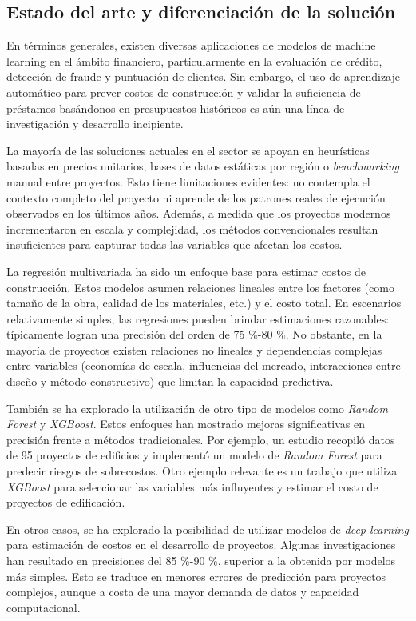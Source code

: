 \documentclass[
11pt, %
]{charter}
\begin{document}
\subsection*{Estado del arte y diferenciación de la solución}

En términos generales, existen diversas aplicaciones de modelos de machine learning en el ámbito financiero, particularmente en la evaluación de crédito, detección de fraude y puntuación de clientes. Sin embargo, el uso de aprendizaje automático para prever costos de construcción y validar la suficiencia de préstamos basándonos en presupuestos históricos es aún una línea de investigación y desarrollo incipiente.

La mayoría de las soluciones actuales en el sector se apoyan en heurísticas basadas en precios unitarios, bases de datos estáticas por región o \textit{benchmarking} manual entre proyectos. Esto tiene limitaciones evidentes: no contempla el contexto completo del proyecto ni aprende de los patrones reales de ejecución observados en los últimos años. Además, a medida que los proyectos modernos incrementaron en escala y complejidad, los métodos convencionales resultan insuficientes para capturar todas las variables que afectan los costos.

La regresión multivariada ha sido un enfoque base para estimar costos de construcción. Estos modelos asumen relaciones lineales entre los factores (como tamaño de la obra, calidad de los materiales, etc.) y el costo total. En escenarios relativamente simples, las regresiones pueden brindar estimaciones razonables: típicamente logran una precisión del orden de 75 \%-80 \%. No obstante, en la mayoría de proyectos existen relaciones no lineales y dependencias complejas entre variables (economías de escala, influencias del mercado, interacciones entre diseño y método constructivo) que limitan la capacidad predictiva.

También se ha explorado la utilización de otro tipo de modelos como \textit{Random Forest} y \textit{XGBoost}. Estos enfoques han mostrado mejoras significativas en precisión frente a métodos tradicionales. Por ejemplo, un estudio recopiló datos de 95 proyectos de edificios y implementó un modelo de \textit{Random Forest} para predecir riesgos de sobrecostos. Otro ejemplo relevante es un trabajo que utiliza \textit{XGBoost} para seleccionar las variables más influyentes y estimar el costo de proyectos de edificación.

En otros casos, se ha explorado la posibilidad de utilizar modelos de \textit{deep learning} para estimación de costos en el desarrollo de proyectos. Algunas investigaciones han resultado en precisiones del 85 \%-90 \%, superior a la obtenida por modelos más simples. Esto se traduce en menores errores de predicción para proyectos complejos, aunque a costa de una mayor demanda de datos y capacidad computacional.
\end{document}
